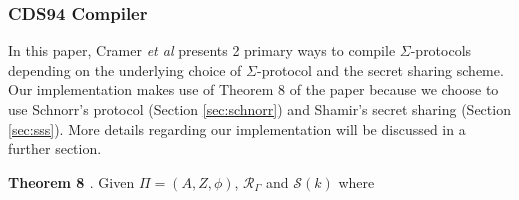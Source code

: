\subsubsection{CDS94 Compiler}
In this paper, Cramer {\em{et al}} \cite{CDS94} presents 2 primary ways to compile $\Sigma$-protocols depending on the underlying choice of $\Sigma$-protocol and the secret sharing scheme. Our implementation makes use of Theorem 8 of the paper because we choose to use Schnorr's protocol (Section \ref{sec:schnorr}) and Shamir's secret sharing (Section \ref{sec:sss}). More details regarding our implementation will be discussed in a further section. 






\textbf{Theorem 8 \cite{CDS94}}. Given $\Pi = (A, Z, \phi)$, $\mathcal R_\Gamma$ and $\mathcal S(k)$ where


